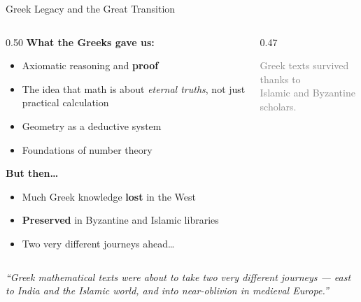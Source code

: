 \begin{frame}[shrink=19]{Greek Legacy and the Great Transition}

  \begin{columns}[T]
    \begin{column}{0.50\textwidth}
      \textbf{What the Greeks gave us:}
      \begin{itemize}
        \item \alert{Axiomatic reasoning} and \textbf{proof}
        \item The idea that math is about \emph{eternal truths}, not just practical calculation
        \item Geometry as a deductive system
        \item Foundations of number theory
      \end{itemize}

      \vspace{0.5em}
      \textbf{But then\ldots}
      \begin{itemize}
        \item Much Greek knowledge \textbf{lost} in the West
        \item \textbf{Preserved} in Byzantine and Islamic libraries
        \item Two very different journeys ahead\ldots
      \end{itemize}
    \end{column}

    \begin{column}{0.47\textwidth}

      \vspace{0.5em}
      {\small\textcolor{gray}{Greek texts survived thanks to\\Islamic and Byzantine scholars.}}
    \end{column}
  \end{columns}

  \vspace{0.3em}
  \begin{center}
    \textcolor{indianSaffron}{\emph{``Greek mathematical texts were about to take two very different journeys ---
    east to India and the Islamic world, and into near-oblivion in medieval Europe.''}}
  \end{center}

\end{frame}
